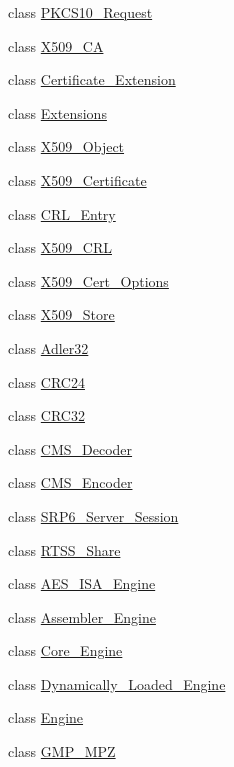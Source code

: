 \begin{DoxyCompactItemize}
class \hyperlink{classBotan_1_1PKCS10__Request}{P\-K\-C\-S10\-\_\-\-Request}
\item 
class \hyperlink{classBotan_1_1X509__CA}{X509\-\_\-\-C\-A}
\item 
class \hyperlink{classBotan_1_1Certificate__Extension}{Certificate\-\_\-\-Extension}
\item 
class \hyperlink{classBotan_1_1Extensions}{Extensions}
\item 
class \hyperlink{classBotan_1_1X509__Object}{X509\-\_\-\-Object}
\item 
class \hyperlink{classBotan_1_1X509__Certificate}{X509\-\_\-\-Certificate}
\item 
class \hyperlink{classBotan_1_1CRL__Entry}{C\-R\-L\-\_\-\-Entry}
\item 
class \hyperlink{classBotan_1_1X509__CRL}{X509\-\_\-\-C\-R\-L}
\item 
class \hyperlink{classBotan_1_1X509__Cert__Options}{X509\-\_\-\-Cert\-\_\-\-Options}
\item 
class \hyperlink{classBotan_1_1X509__Store}{X509\-\_\-\-Store}
\item 
class \hyperlink{classBotan_1_1Adler32}{Adler32}
\item 
class \hyperlink{classBotan_1_1CRC24}{C\-R\-C24}
\item 
class \hyperlink{classBotan_1_1CRC32}{C\-R\-C32}
\item 
class \hyperlink{classBotan_1_1CMS__Decoder}{C\-M\-S\-\_\-\-Decoder}
\item 
class \hyperlink{classBotan_1_1CMS__Encoder}{C\-M\-S\-\_\-\-Encoder}
\item 
class \hyperlink{classBotan_1_1SRP6__Server__Session}{S\-R\-P6\-\_\-\-Server\-\_\-\-Session}
\item 
class \hyperlink{classBotan_1_1RTSS__Share}{R\-T\-S\-S\-\_\-\-Share}
\item 
class \hyperlink{classBotan_1_1AES__ISA__Engine}{A\-E\-S\-\_\-\-I\-S\-A\-\_\-\-Engine}
\item 
class \hyperlink{classBotan_1_1Assembler__Engine}{Assembler\-\_\-\-Engine}
\item 
class \hyperlink{classBotan_1_1Core__Engine}{Core\-\_\-\-Engine}
\item 
class \hyperlink{classBotan_1_1Dynamically__Loaded__Engine}{Dynamically\-\_\-\-Loaded\-\_\-\-Engine}
\item 
class \hyperlink{classBotan_1_1Engine}{Engine}
\item 
class \hyperlink{classBotan_1_1GMP__MPZ}{G\-M\-P\-\_\-\-M\-P\-Z}

\end{DoxyCompactItemize}
